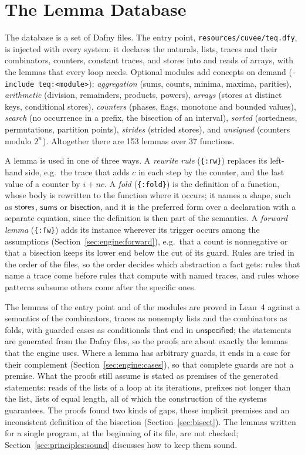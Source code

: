 \section{The Lemma Database}\label{sec:engine:db}

The database is a set of Dafny files. The entry point, \texttt{resources/cuvee/teq.dfy}, is injected with every
system: it declares the naturals, lists, traces and their combinators, counters, constant traces, and stores into and
reads of arrays, with the lemmas that every loop needs. Optional modules add concepts on demand
(\texttt{-include teq:<module>}): \emph{aggregation} (sums, counts, minima, maxima, parities), \emph{arithmetic}
(division, remainders, products, powers), \emph{arrays} (stores at distinct keys, conditional stores), \emph{counters}
(phases, flags, monotone and bounded values), \emph{search} (no occurrence in a prefix, the bisection of an interval),
\emph{sorted} (sortedness, permutations, partition points), \emph{strides} (strided stores), and \emph{unsigned}
(counters modulo $2^w$). Altogether there are 153 lemmas over 37 functions.

A lemma is used in one of three ways. A \emph{rewrite rule} (\texttt{\{:rw\}}) replaces its left-hand side, e.g.\ the
trace that adds $c$ in each step by the counter, and the last value of a counter by $i + nc$. A \emph{fold}
(\texttt{\{:fold\}}) is the definition of a function, whose body is rewritten to the function where it occurs; it names
a shape, such as $\mathsf{stores}$, $\mathsf{sums}$ or $\mathsf{bisection}$, and it is the preferred form over a declaration
with a separate equation, since the definition is then part of the semantics. A \emph{forward lemma}
(\texttt{\{:fw\}}) adds its instance wherever its trigger occurs among the assumptions
(Section~\ref{sec:engine:forward}), e.g.\ that a count is nonnegative or that a bisection keeps its lower end below the
cut of its guard. Rules are tried in the order of the files, so the order decides which abstraction a fact gets: rules
that name a trace come before rules that compute with named traces, and rules whose patterns subsume others come after
the specific ones.

The lemmas of the entry point and of the modules are proved in Lean~4 against a semantics of the combinators, traces as
nonempty lists and the combinators as folds, with guarded cases as conditionals that end in $\mathsf{unspecified}$; the
statements are generated from the Dafny files, so the proofs are about exactly the lemmas that the engine uses. Where a
lemma has arbitrary guards, it ends in a case for their complement (Section~\ref{sec:engine:cases}), so that complete
guards are not a premise. What the proofs still assume is stated as premises of the generated statements: reads of the
lists of a loop at its iterations, prefixes not longer than the list, lists of equal length, all of which the
construction of the systems guarantees. The proofs found two kinds of gaps, these implicit premises and an inconsistent
definition of the bisection (Section~\ref{sec:bisect}). The lemmas written for a single program, at the beginning of its
file, are not checked; Section~\ref{sec:principles:sound} discusses how to keep them sound.
